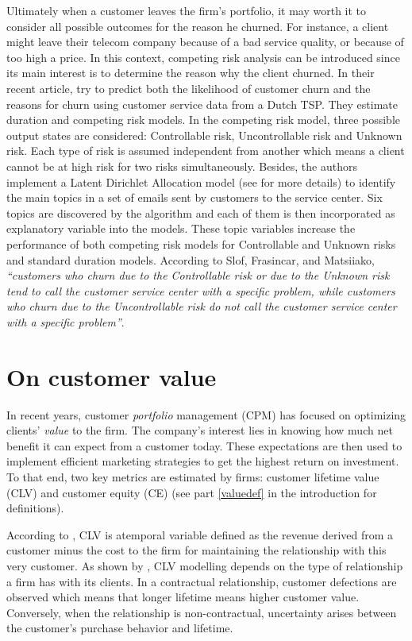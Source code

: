 \documentclass[
]{book}
\begin{document}
Ultimately when a customer leaves the firm's portfolio, it may worth it to consider all possible outcomes for the reason he churned. For instance, a client might leave their telecom company because of a bad service quality, or because of too high a price. In this context, competing risk analysis can be introduced since its main interest is to determine the reason why the client churned. In their recent article, \citet{COMPETING_RISKS} try to predict both the likelihood of customer churn and the reasons for churn using customer service data from a Dutch TSP. They estimate duration and competing risk models. In the competing risk model, three possible output states are considered: Controllable risk, Uncontrollable risk and Unknown risk. Each type of risk is assumed independent from another which means a client cannot be at high risk for two risks simultaneously. Besides, the authors implement a Latent Dirichlet Allocation model (see \citet{LDA} for more details) to identify the main topics in a set of emails sent by customers to the service center. Six topics are discovered by the algorithm and each of them is then incorporated as explanatory variable into the models. These topic variables increase the performance of both competing risk models for Controllable and Unknown risks and standard duration models. According to Slof, Frasincar, and Matsiiako, \emph{``customers who churn due to the Controllable risk or due to the Unknown risk tend to call the customer service center with a specific problem, while customers who churn due to the Uncontrollable risk do not call the customer service center with a specific problem''}.

\hypertarget{value}{%
\section{On customer value}\label{value}}

In recent years, customer \emph{portfolio} management (CPM) has focused on optimizing clients' \emph{value} to the firm. The company's interest lies in knowing how much net benefit it can expect from a customer today. These expectations are then used to implement efficient marketing strategies to get the highest return on investment. To that end, two key metrics are estimated by firms: customer lifetime value (CLV) and customer equity (CE) (see part \ref{valuedef} in the introduction for definitions).

According to \citet{CLV_DEF}, CLV is atemporal variable defined as the revenue derived from a customer minus the cost to the firm for maintaining the relationship with this very customer. As shown by \citet{CLV_CONTEXT}, CLV modelling depends on the type of relationship a firm has with its clients. In a contractual relationship, customer defections are observed which means that longer lifetime means higher customer value. Conversely, when the relationship is non-contractual, uncertainty arises between the customer's purchase behavior and lifetime.
\end{document}
